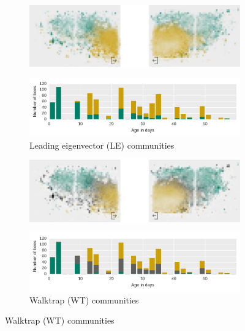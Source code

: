 \begin{figure}[htbp]
	\centering
	\begin{subfigure}[b]{1.0\textwidth}
	\centering
	\includegraphics[width=1.0\textwidth]{Figures/le_network3}
	\end{subfigure}
	
	\begin{subfigure}[b]{1.0\textwidth}
	\centering
	\includegraphics[width=1.0\textwidth]{Figures/n3-ageDistribution-LE}
	\caption[Leading eigenvector (LE) communities]{Leading eigenvector (LE) communities}
	\label{fig:n3ageLE}
	\end{subfigure}
	
	
	
	\begin{subfigure}[b]{1.0\textwidth}
	\vspace{1pt}
	\centering
	\includegraphics[width=1.0\textwidth]{Figures/wt_network3}
	\end{subfigure}
	
	\begin{subfigure}[b]{1.0\textwidth}
	\centering
	\includegraphics[width=1.0\textwidth]{Figures/n3-ageDistribution-WT}
	\caption[Walktrap (WT) communities]{Walktrap (WT) communities}
	\label{fig:n3ageWT}
	\end{subfigure}
	

\end{figure}

